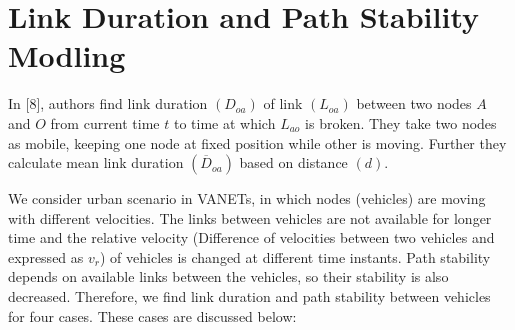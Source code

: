\documentclass[journal]{IEEEtran}
\begin{document}
\section{Link Duration and Path Stability Modling}
In [8], authors find link duration $(D_{oa})$ of link $(L_{oa})$ between two nodes $A$ and $O$ from current time $t$ to time at which $L_{ao}$ is broken. They take two nodes as mobile, keeping one node at fixed position while other is moving. Further they calculate mean link duration $({\overline{D}_{oa}})$ based on distance $(d)$.

We consider urban scenario in VANETs, in which nodes (vehicles) are moving with different velocities. The links between vehicles are not available for longer time and the relative velocity (Difference of velocities between two vehicles and expressed as $v_r$) of vehicles is changed at different time instants. Path stability depends on available links between the vehicles, so their stability is also decreased. Therefore, we find link duration and path stability between vehicles for four cases. These cases are discussed below:
\end{document}
